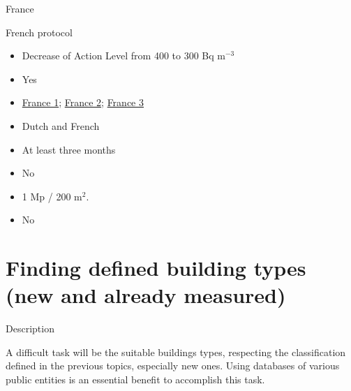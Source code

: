 \documentclass[xcolor=svgnames]{beamer}
\newcommand{\1}{\'{\i}}
\begin{document}
\begin{frame}{France}

\begin{exampleblock}{French protocol}

\begin{itemize}[font=\bfseries, leftmargin=3.5cm]
\item[Limit] Decrease of Action Level from 400 to 300 Bq m$^{-3}$
\item[Protocol] Yes
\item[Link] \href{https://www.asn.fr/Informer/Actualites/3eme-plan-national-d-action-2016-2019-pour-la-gestion-du-risque-lie-au-radon}{France 1}; \href{https://www.asn.fr/Informer/Dossiers-pedagogiques/Le-radon/Guides-sur-la-gestion-du-risque-du-radon/Guide-pour-la-gestion-du-risque-lie-au-radon-a-destination-des-employeurs}{France 2}; \href{https://professionnels.asn.fr/Agrements-controles-et-mesures/Le-radon/Plans-nationaux-d-action-pour-la-gestion-du-risque-lie-au-radon/Plan-national-d-action-2016-2019-pour-la-gestion-du-risque-lie-au-radon}{France 3}
\item[Language] Dutch and French
\item[Measuring period] At least three months
\item[Correction] No
\item[Rules] 1 Mp / 200 m$^{2}$.
\item[Other protocols] No
\end{itemize}

\end{exampleblock}

\end{frame}




\section[Defined \ldots]{Finding defined building types (new and already measured)}

\frame{\tableofcontents[currentsection]}

\begin{frame}{Description}

A difficult task will be the suitable buildings types, respecting the classification defined in the previous topics, especially new ones. Using databases of various public entities is an essential benefit to accomplish this task. 

\end{frame}
\end{document}
